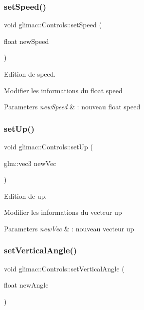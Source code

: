 \subsubsection{\texorpdfstring{set\+Speed()}{setSpeed()}}
{\footnotesize\ttfamily void glimac\+::\+Controls\+::set\+Speed (\begin{DoxyParamCaption}\item[{float}]{new\+Speed }\end{DoxyParamCaption})}



Edition de speed. 

Modifier les informations du float speed


\begin{DoxyParams}{Parameters}
{\em new\+Speed} & \+: nouveau float speed \\
\hline
\end{DoxyParams}
\mbox{\label{classglimac_1_1Controls_aa9d4839c153b46efa419af8599d07d7b}} 
\subsubsection{\texorpdfstring{set\+Up()}{setUp()}}
{\footnotesize\ttfamily void glimac\+::\+Controls\+::set\+Up (\begin{DoxyParamCaption}\item[{glm\+::vec3}]{new\+Vec }\end{DoxyParamCaption})}



Edition de up. 

Modifier les informations du vecteur up


\begin{DoxyParams}{Parameters}
{\em new\+Vec} & \+: nouveau vecteur up \\
\hline
\end{DoxyParams}
\mbox{\label{classglimac_1_1Controls_a83626414d05716552bfe4a919ea0ff5c}} 
\subsubsection{\texorpdfstring{set\+Vertical\+Angle()}{setVerticalAngle()}}
{\footnotesize\ttfamily void glimac\+::\+Controls\+::set\+Vertical\+Angle (\begin{DoxyParamCaption}\item[{float}]{new\+Angle }\end{DoxyParamCaption})}



